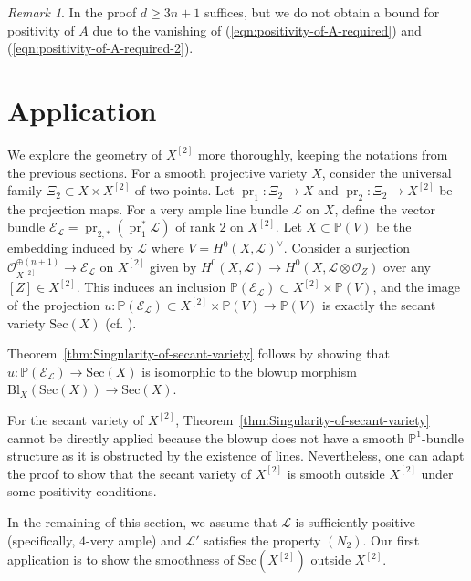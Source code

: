 \documentclass[a4paper]{amsart}
\numberwithin{equation}{section}
\theoremstyle{plain}
\theoremstyle{definition}
\theoremstyle{remark}
\newtheorem{rmk}[thm]{Remark}
\numberwithin{figure}{section}
\numberwithin{table}{section}
\numberwithin{equation}{section}
\def \PP {\mathbb{P}}
\def \Ecal {\mathcal{E}}
\def \Lcal {\mathcal{L}}
\def \Ocal {\mathcal{O}}
\DeclareMathOperator{\pr}{pr}
\begin{document}
\begin{rmk} \label{rem:bound-for-positivity}
    In the proof $d \geq 3n+1$ suffices, but we do not obtain a bound for positivity of $A$ due to the vanishing of (\ref{eqn:positivity-of-A-required}) and (\ref{eqn:positivity-of-A-required-2}).
\end{rmk}


\section{Application} \label{sec:application}


We explore the geometry of $X^{[2]}$ more thoroughly, keeping the notations from the previous sections.
For a smooth projective variety $X$, consider the universal family $\Xi_2 \subset X \times X^{[2]}$ of two points.
Let $\pr_1:\Xi_2 \rightarrow X$ and $\pr_2:\Xi_2 \rightarrow X^{[2]}$ be the projection maps.
For a very ample line bundle $\Lcal$ on $X$, define the vector bundle $\Ecal_{\Lcal} = \pr_{2, \ast}(\pr_1^{\ast} \Lcal)$ of rank $2$ on $X^{[2]}$.
Let $X \subset \PP(V)$ be the embedding induced by $\Lcal$ where $V = H^0(X,\Lcal)^{\vee}$.
Consider a surjection $\Ocal_{X^{[2]}}^{\oplus (n+1)} \rightarrow \Ecal_{\Lcal}$ on $X^{[2]}$ given by $H^0(X,\Lcal) \rightarrow H^0(X,\Lcal \otimes \Ocal_{Z})$ over any $[Z] \in X^{[2]}$.
This induces an inclusion $\PP(\Ecal_{\Lcal}) \subset X^{[2]} \times \PP(V)$, and the image of the projection $u:\PP(\Ecal_{\Lcal}) \subset X^{[2]} \times \PP(V) \rightarrow \PP(V)$ is exactly the secant variety $\mathrm{Sec}(X)$ (cf. \cite[Section~3]{Vermeire2001}).

Theorem~\ref{thm:Singularity-of-secant-variety} follows by showing that $u:\PP(\Ecal_{\Lcal}) \rightarrow \mathrm{Sec}(X)$ is isomorphic to the blowup morphism $\mathrm{Bl}_{X}(\mathrm{Sec}(X)) \rightarrow \mathrm{Sec}(X)$.

For the secant variety of $X^{[2]}$, Theorem~\ref{thm:Singularity-of-secant-variety} cannot be directly applied because the blowup does not have a smooth $\PP^1$-bundle structure as it is obstructed by the existence of lines.
Nevertheless, one can adapt the proof to show that the secant variety of $X^{[2]}$ is smooth outside $X^{[2]}$ under some positivity conditions.

In the remaining of this section, we assume that $\Lcal$ is sufficiently positive (specifically, $4$-very ample) and $\Lcal'$ satisfies the property $(N_2)$.
Our first application is to show the smoothness of $\mathrm{Sec}(X^{[2]})$ outside $X^{[2]}$.
\end{document}
